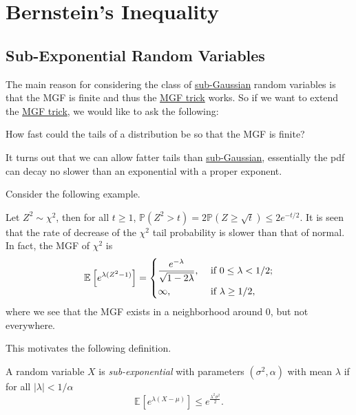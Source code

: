 \section{Bernstein's Inequality}
\subsection{Sub-Exponential Random Variables}
The main reason for considering the class of \hyperref[def:sub-Gaussian]{sub-Gaussian} random variables is that the MGF is finite and thus the \hyperref[lma:MGF-trick]{MGF trick} works. So if we want to extend the \hyperref[lma:MGF-trick]{MGF trick}, we would like to ask the following:

\begin{problem*}
	How fast could the tails of a distribution be so that the MGF is finite?
\end{problem*}
\begin{answer}
	It turns out that we can allow fatter tails than \hyperref[def:sub-Gaussian]{sub-Gaussian}, essentially the pdf can decay no slower than an exponential with a proper exponent.
\end{answer}

Consider the following example.

\begin{eg}
	Let \(Z^2 \sim \chi ^2\), then for all \(t \geq 1\), \(\mathbb{P} (Z^2 > t) = 2\mathbb{P} (Z \geq \sqrt{t} ) \leq 2 e^{-t / 2}\). It is seen that the rate of decrease of the \(\chi ^2\) tail probability is slower than that of normal. In fact, the MGF of \(\chi ^{2} \) is
	\[
		\mathbb{E}_{}\left[e^{\lambda (Z^2 - 1)} \right] =
		\begin{dcases}
			\frac{e^{-\lambda }}{\sqrt{1 - 2 \lambda } }, & \text{ if } 0 \leq \lambda < 1 / 2 ; \\
			\infty ,                                      & \text{ if } \lambda  \geq 1 / 2 ,
		\end{dcases}
	\]
	where we see that the MGF exists in a neighborhood around \(0\), but not everywhere.
\end{eg}

This motivates the following definition.

\begin{definition}\label{def:sub-exponential}
	A random variable \(X\) is \emph{sub-exponential} with parameters \((\sigma ^{2} , \alpha )\) with mean \(\lambda \) if for all \(\vert \lambda  \vert < 1 / \alpha \)
	\[
		\mathbb{E}_{}\left[e^{\lambda (X - \mu )} \right] \leq e^{\frac{\lambda ^{2} \sigma ^{2} }{2}}.
	\]
\end{definition}

